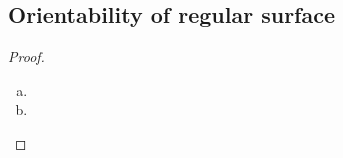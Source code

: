 
{

\subsection{Orientability of regular surface}


\begin{proof}
\begin{enumerate}[(a)]
	\item
	\item
\end{enumerate}
\end{proof}

}
